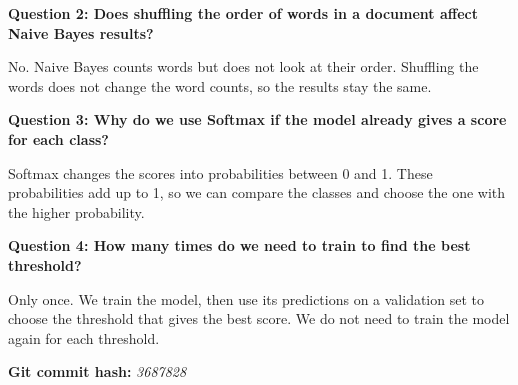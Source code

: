 \documentclass[a4paper,9pt]{article}
\begin{document}
\textbf{Question 2: Does shuffling the order of words in a document
affect Naive Bayes results?}

No. Naive Bayes counts words but does not look at their order.
Shuffling the words does not change the word counts, so the results
stay the same.

\textbf{Question 3: Why do we use Softmax if the model already gives
a score for each class?}

Softmax changes the scores into probabilities between 0 and 1.
These probabilities add up to 1, so we can compare the classes and
choose the one with the higher probability.

\textbf{Question 4: How many times do we need to train to find the
best threshold?}

Only once. We train the model, then use its predictions on a
validation set to choose the threshold that gives the best score.
We do not need to train the model again for each threshold.

\vspace{2pt}
\textbf{Git commit hash:} \textit{3687828}
\end{document}
